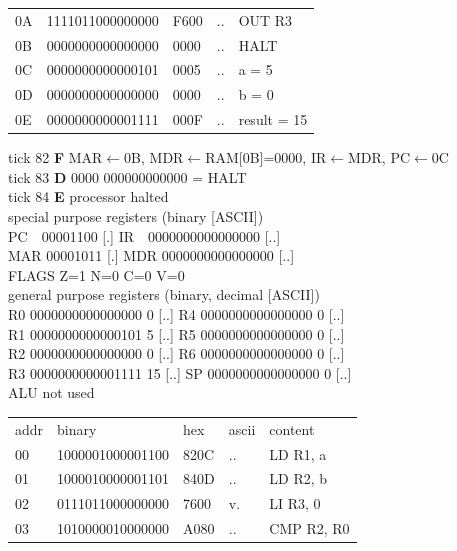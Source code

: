\begin{tcolorbox}[stepbox, title={Instruction 27 \hfill ticks 79 to 81 \quad OUT R3}]
{\begin{tabular}{@{}lllll@{}}
0A & 1111011000000000 & F600 & .. & OUT R3\\
\rowcolor{pcc}0B & 0000000000000000 & 0000 & .. & HALT\\
\rowcolor{datac}0C & 0000000000000101 & 0005 & .. & a = 5\\
\rowcolor{datac}0D & 0000000000000000 & 0000 & .. & b = 0\\
\rowcolor{datac}0E & 0000000000001111 & 000F & .. & result = 15\\
\end{tabular}}
\end{tcolorbox}\hfill\begin{tcolorbox}[stepbox, title={Instruction 28 \hfill ticks 82 to 84 \quad HALT}]
\textcolor{dim}{tick 82} \textbf{F} MAR$\leftarrow$0B, MDR$\leftarrow$RAM[0B]=0000, IR$\leftarrow$MDR, PC$\leftarrow$0C\\
\textcolor{dim}{tick 83} \textbf{D} 0000 000000000000 = HALT\\
\textcolor{dim}{tick 84} \textbf{E} processor halted\\[2pt]
\textcolor{dim}{special purpose registers (binary [ASCII])}\\
PC~~00001100 [.] \hfill IR~~0000000000000000 [..]\\
MAR 00001011 [.] \hfill MDR 0000000000000000 [..]\\
FLAGS Z=1 N=0 C=0 V=0\\[2pt]
\textcolor{dim}{general purpose registers (binary, decimal [ASCII])}\\
R0 0000000000000000 0 [..] \hfill R4 0000000000000000 0 [..]\\
R1 0000000000000101 5 [..] \hfill R5 0000000000000000 0 [..]\\
R2 0000000000000000 0 [..] \hfill R6 0000000000000000 0 [..]\\
R3 0000000000001111 15 [..] \hfill SP 0000000000000000 0 [..]\\
\textcolor{dim}{ALU not used}\\[2pt]
{\setlength{\tabcolsep}{2pt}\begin{tabular}{@{}lllll@{}}
\textcolor{dim}{addr} & \textcolor{dim}{binary} & \textcolor{dim}{hex} & \textcolor{dim}{ascii} & \textcolor{dim}{content}\\
00 & 1000001000001100 & 820C & .. & LD R1, a\\
01 & 1000010000001101 & 840D & .. & LD R2, b\\
02 & 0111011000000000 & 7600 & v. & LI R3, 0\\
03 & 1010000010000000 & A080 & .. & CMP R2, R0\\

\end{tabular}}
\end{tcolorbox}
